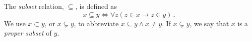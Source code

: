 \guard



\begin{defn}
\label{defn:subset}
  The \emph{subset} relation, $\subseteq$, is defined as \[ x\subseteq y\iff\forall z(z\in x\rightarrow z\in y)\,.\]
  We use $x\subset y$, or $x\subsetneq y$, to abbreviate $x\subseteq y\wedge x\not=y$.
  If $x\subsetneq y$, we say that $x$ is a \emph{proper subset} of $y$.
\end{defn}
